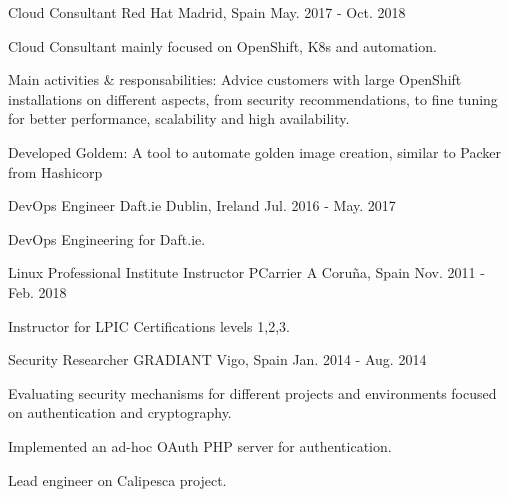 \begin{cventries}
  \cventry
    {Cloud Consultant} %
    {Red Hat} %
    {Madrid, Spain} %
    {May. 2017 - Oct. 2018} %
    {
      \begin{cvitems} %
        \item {Cloud Consultant mainly focused on OpenShift, K8s and automation.}
        \item {Main activities \& responsabilities: Advice customers with large OpenShift installations on different aspects, from security recommendations, to fine tuning for better performance, scalability and high availability.}
        \item {Developed Goldem: A tool to automate golden image creation, similar to Packer from Hashicorp}
      \end{cvitems}
    }
  \cventry
    {DevOps Engineer} %
    {Daft.ie} %
    {Dublin, Ireland} %
    {Jul. 2016 - May. 2017} %
    {
      \begin{cvitems} %
        \item {DevOps Engineering for Daft.ie.}
      \end{cvitems}
    }
  \cventry
    {Linux Professional Institute Instructor} %
    {PCarrier} %
    {A Coruña, Spain} %
    {Nov. 2011 - Feb. 2018} %
    {
      \begin{cvitems} %
        \item {Instructor for LPIC Certifications levels 1,2,3.}
      \end{cvitems}
    }
  \cventry
    {Security Researcher} %
    {GRADIANT} %
    {Vigo, Spain} %
    {Jan. 2014 - Aug. 2014} %
    {
      \begin{cvitems} %
        \item {Evaluating security mechanisms for different projects and environments focused on authentication and cryptography.}
        \item {Implemented an ad-hoc OAuth PHP server for authentication.}
        \item {Lead engineer on Calipesca project.}
      \end{cvitems}
}
\end{cventries}

